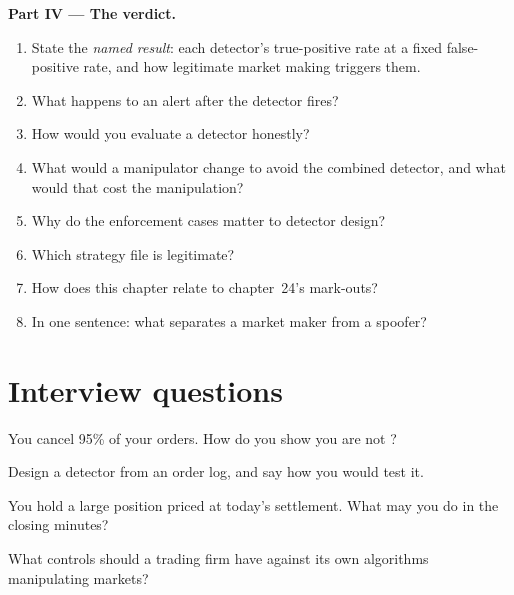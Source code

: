\begin{problem}
\medskip\noindent\textbf{Part IV --- The verdict.}
\begin{enumerate}[resume]
\item State the \emph{named result}: each detector's true-positive rate at a fixed false-positive rate, and how legitimate market making triggers them.
\item What happens to an alert after the detector fires?
\item How would you evaluate a detector honestly?
\item What would a manipulator change to avoid the combined detector, and what would that cost the manipulation?
\item Why do the enforcement cases matter to detector design?
\item Which strategy file is legitimate?
\item How does this chapter relate to chapter~24's mark-outs?
\item In one sentence: what separates a market maker from a spoofer?
\end{enumerate}
\end{problem}

\section{Interview questions}

\begin{interviewq}\label{iq:s2:manipulative-strategies-and-how-they-are-caught:1}
You cancel 95\% of your orders. How do you show you are not ?
\end{interviewq}

\begin{interviewq}\label{iq:s2:manipulative-strategies-and-how-they-are-caught:2}
Design a  detector from an order log, and say how you would test it.
\end{interviewq}

\begin{interviewq}\label{iq:s2:manipulative-strategies-and-how-they-are-caught:3}
You hold a large position priced at today's settlement. What may you do in the closing minutes?
\end{interviewq}

\begin{interviewq}\label{iq:s2:manipulative-strategies-and-how-they-are-caught:4}
What controls should a trading firm have against its own algorithms manipulating markets?
\end{interviewq}


